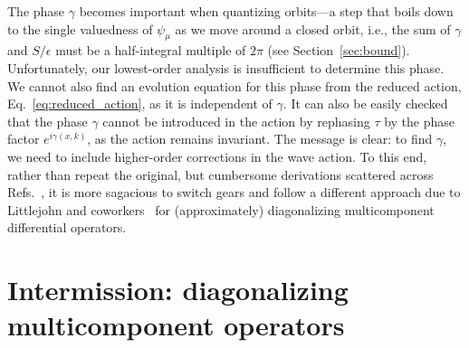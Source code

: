 The phase $\gamma$ becomes important when quantizing orbits---a step that boils down to the single valuedness of $\psi_{\mu}$ as we move around a closed orbit, i.e., the sum of $\gamma$ and $S/\epsilon$ must be a half-integral multiple of $2\pi$ (see Section~\ref{sec:bound}).
Unfortunately, our lowest-order analysis is insufficient to determine this phase.
We cannot also find an evolution equation for this phase from the reduced action, Eq.~\eqref{eq:reduced_action}, as it is independent of $\gamma$.
It can also be easily checked that the phase $\gamma$ cannot be introduced in the action by rephasing $\tau$ by the phase factor $e^{i\gamma(x,k)}$, as the action remains invariant.
The message is clear: to find $\gamma$, we need to include higher-order corrections in the wave action.
To this end, rather than repeat the original, but cumbersome derivations scattered across Refs.~\cite{bernstein1975,berk1980,yabana1986,kaufman1987}, it is more sagacious to switch gears and follow a different approach due to Littlejohn and coworkers~\cite{littlejohn1991,littlejohn1991a} for (approximately) diagonalizing multicomponent differential operators.


\section{Intermission: diagonalizing multicomponent operators}
\label{sec:diagonalize}

